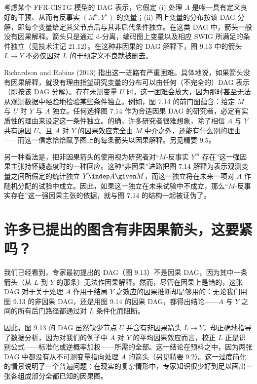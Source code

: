\begin{finepoint}
考虑某个 FFR-CISTG 模型的 DAG 表示，它假定 (i) 处理 $A$ 是唯一具有定义良好的干预、从而有反事实 $(M^{a},Y^{a})$ 的变量；(ii) 图上变量的分布按该 DAG 分解，即每个变量给定其父节点后与其非后代条件独立。在这类 DAG 中，箭头一般没有因果解释。箭头只是通过 d-分离，编码图上变量以及相应 SWIG 所满足的条件独立（见技术注记 21.12）。在这种非因果的 DAG 解释下，图 9.13 中的箭头 $L\rightarrow Y$ 不必仅因对 $L$ 的干预定义不良就被删去。

Richardson and Robins (2013) 指出这一进路有严重困难。具体地说，如果箭头没有因果解释，就没有理由指望研究变量的分布可以由任何（不完全的）DAG 表示（即按该 DAG 分解）。存在未测变量 $U$ 时，这一困难会放大，因为那时甚至无法从观测数据中经验地检验某些条件独立。例如，图 7.14 的前门图蕴含：给定 $M$ 与 $U$ 时 $Y$ 与 $A$ 独立。任何选择图 7.14 作为合适因果 DAG 的研究者，必定有实质性的理由来设定这一条件独立。的确，许多研究者很难想象，除了相信 $A$ 与 $Y$ 共有原因 $U$、且 $A$ 对 $Y$ 的因果效应完全由 $M$ 中介之外，还能有什么别的理由——而这一信念恰恰赋予图上的每条箭头以因果解释。另见精要 9.5。

另一种看法是，把非因果箭头的使用视为研究者对“$M$-反事实 $Y^{m}$ 存在”这一强因果主张持怀疑态度时的一种回应。这种“非因果”进路把图 7.14 解释为表示观测变量之间所假定的统计独立 $Y\indep A\given M$，而这一独立将在未来一项对 $A$ 作随机分配的试验中成立。因此，如果这一独立在未来试验中不成立，那么“$M$-反事实存在”这一强因果主张的依据，就与图 7.14 的结构一起被证伪了。
\end{finepoint}

\section{许多已提出的图含有非因果箭头，这要紧吗？}

我们已经看到，专家最初提出的 DAG（图 9.13）不是因果 DAG，因为其中一条箭头（从 $L$ 到 $Y$ 的那条）无法作因果解释。然而，尽管在因果上是错的，这张 DAG 对于关于处理 $A$ 作用于结局 $Y$ 之效应的因果推断却是够用的：无论我们用图 9.13 的非因果 DAG，还是用图 9.14 的因果 DAG，都得出结论——$A$ 与 $Y$ 之间的所有后门路径都通过对 $L$ 条件化而阻断。

因此，图 9.13 的 DAG 虽然缺少节点 $U$ 并含有非因果箭头 $L\rightarrow Y$，却正确地指导了数据分析，因为对我们的例子中 $A$ 对 $Y$ 的平均因果效应而言，校正 $L$ 正是识别公式——标准化或逆概率加权——所需的全部。这一结论在预料之中，因为两张 DAG 中都没有从不可测变量指向处理 $A$ 的箭头（另见精要 9.2）。这一过度简化的情景说明了一个普遍问题：在现实的复杂情形中，专家知识很少好到足以画出一张各组成部分全都已知的因果图。

